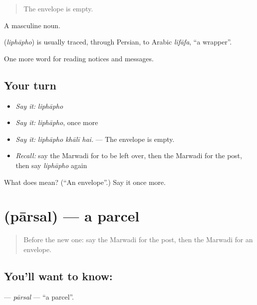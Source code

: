 \begin{quote}
The envelope is empty.
\end{quote}

A masculine noun.

\begin{cousinweb}
\textbf{} (\emph{liphāpho}) is usually traced, through Persian, to Arabic \emph{lifāfa}, \textquotedblleft{}a wrapper\textquotedblright{}.
\end{cousinweb}

\begin{grammarlens}[title={What you've built}]
One more word for reading notices and messages.
\end{grammarlens}

\subsection*{Your turn}
\begin{itemize}
\raggedright
  \item \emph{Say it:} \emph{liphāpho}
  \item \emph{Say it:} \emph{liphāpho}, once more
  \item \emph{Say it:} \emph{liphāpho khālī hai.} — The envelope is empty.
  \item \emph{Recall:} say the Marwadi for to be left over, then the Marwadi for the post, then say \emph{liphāpho} again
\end{itemize}

\begin{tcolorbox}[breakable,colback=teal!4,colframe=teal!35!black,title={Before you move on}]
What does  mean? (\textquotedblleft{}An envelope\textquotedblright{}.) Say it once more.
\end{tcolorbox}
\section[\texorpdfstring{\mw{पारसल} (pārsal)}{पारसल (pārsal)}]{ (pārsal) — a parcel}

\label{lesson:MW-C196-parsal}



\begin{quote}
Before the new one: say the Marwadi for the post, then the Marwadi for an envelope.
\end{quote}

\subsection*{You'll want to know: }
\textbf{} — \emph{pārsal} — \textquotedblleft{}a parcel\textquotedblright{}.

